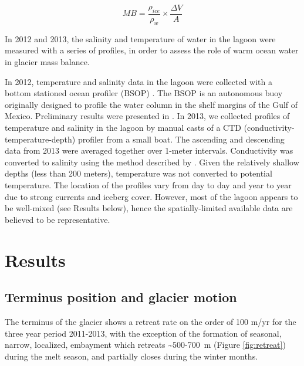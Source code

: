 \begin{equation}MB=\frac{\rho_{ice}}{\rho_w} \times \frac{\Delta V}{A}\end{equation}
 

In 2012 and 2013, the salinity and temperature of water in the lagoon were measured with a series of profiles, in order to assess the role of warm ocean water in glacier mass balance. 

In 2012, temperature and salinity data in the lagoon were collected with a bottom stationed ocean profiler (BSOP) \citep{langebrake2002design}. The BSOP is an autonomous buoy originally designed to profile the water column in the shelf margins of the Gulf of Mexico. Preliminary results were presented in \citet{DIXONEOS}. In 2013, we collected profiles of temperature and salinity in the lagoon by manual casts of a CTD (conductivity-temperature-depth) profiler from a small boat.
The ascending and descending data from 2013 were averaged together over 1-meter intervals. Conductivity was converted to salinity using the method described by \citet{fofonoff1983algorithms}.  Given the relatively shallow depths (less than 200 meters), temperature was not converted to potential temperature.  The location of the profiles vary from day to day and year to year due to strong currents and iceberg cover.  However, most of the lagoon appears to be well-mixed (see Results below), hence the spatially-limited available data are believed to be representative. 


\section{Results}
\subsection{Terminus position and glacier motion}
The terminus of the glacier shows a retreat rate on the order of 100 m/yr for the three year period 2011-2013, with the exception of the formation of seasonal, narrow, localized, embayment which retreats \textasciitilde500-700~m (Figure \ref{fig:retreat}) during the melt season, and partially closes during the winter months. 




